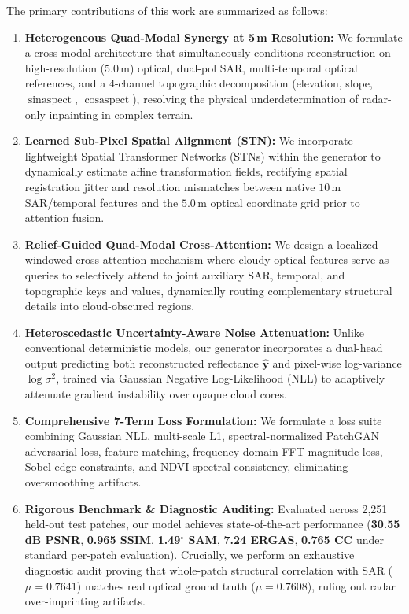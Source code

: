 The primary contributions of this work are summarized as follows:
\begin{enumerate}
    \item \textbf{Heterogeneous Quad-Modal Synergy at 5\,m Resolution:} We formulate a cross-modal architecture that simultaneously conditions reconstruction on high-resolution ($5.0\,\text{m}$) optical, dual-pol SAR, multi-temporal optical references, and a 4-channel topographic decomposition (elevation, slope, $\sin\text{aspect}$, $\cos\text{aspect}$), resolving the physical underdetermination of radar-only inpainting in complex terrain.
    \item \textbf{Learned Sub-Pixel Spatial Alignment (STN):} We incorporate lightweight Spatial Transformer Networks (STNs) within the generator to dynamically estimate affine transformation fields, rectifying spatial registration jitter and resolution mismatches between native $10\,\text{m}$ SAR/temporal features and the $5.0\,\text{m}$ optical coordinate grid prior to attention fusion.
    \item \textbf{Relief-Guided Quad-Modal Cross-Attention:} We design a localized windowed cross-attention mechanism where cloudy optical features serve as queries to selectively attend to joint auxiliary SAR, temporal, and topographic keys and values, dynamically routing complementary structural details into cloud-obscured regions.
    \item \textbf{Heteroscedastic Uncertainty-Aware Noise Attenuation:} Unlike conventional deterministic models, our generator incorporates a dual-head output predicting both reconstructed reflectance $\hat{\mathbf{y}}$ and pixel-wise log-variance $\log \sigma^2$, trained via Gaussian Negative Log-Likelihood (NLL) to adaptively attenuate gradient instability over opaque cloud cores.
    \item \textbf{Comprehensive 7-Term Loss Formulation:} We formulate a loss suite combining Gaussian NLL, multi-scale L1, spectral-normalized PatchGAN adversarial loss, feature matching, frequency-domain FFT magnitude loss, Sobel edge constraints, and NDVI spectral consistency, eliminating oversmoothing artifacts.
    \item \textbf{Rigorous Benchmark \& Diagnostic Auditing:} Evaluated across 2,251 held-out test patches, our model achieves state-of-the-art performance (\textbf{30.55\,dB PSNR}, \textbf{0.965 SSIM}, \textbf{1.49$^\circ$ SAM}, \textbf{7.24 ERGAS}, \textbf{0.765 CC} under standard per-patch evaluation). Crucially, we perform an exhaustive diagnostic audit proving that whole-patch structural correlation with SAR ($\mu = 0.7641$) matches real optical ground truth ($\mu = 0.7608$), ruling out radar over-imprinting artifacts.
\end{enumerate}
